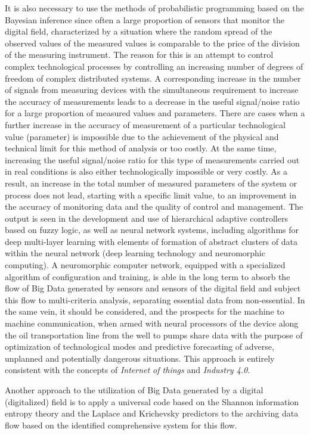 \documentclass[12pt]{report}
\theoremstyle{definition}
\begin{document}
It is also necessary to use the methods of probabilistic programming based on the Bayesian inference since often a large proportion of sensors that monitor the digital field, characterized by a situation where the random spread of the observed values of the measured values is comparable to the price of the division of the measuring instrument.
The reason for this is an attempt to control complex technological processes by controlling an increasing number of degrees of freedom of complex distributed systems.
A corresponding increase in the number of signals from measuring devices with the simultaneous requirement to increase the accuracy of measurements leads to a decrease in the useful signal/noise ratio for a large proportion of measured values and parameters.
There are cases when a further increase in the accuracy of measurement of a particular technological value (parameter) is impossible due to the achievement of the physical and technical limit for this method of analysis or too costly.
At the same time, increasing the useful signal/noise ratio for this type of measurements carried out in real conditions is also either technologically impossible or very costly.
As a result, an increase in the total number of measured parameters of the system or process does not lead, starting with a specific limit value, to an improvement in the accuracy of monitoring data and the quality of control and management.
The output is seen in the development and use of hierarchical adaptive controllers based on fuzzy logic, as well as neural network systems, including algorithms for deep multi-layer learning with elements of formation of abstract clusters of data within the neural network (deep learning technology and neuromorphic computing).
A neuromorphic computer network, equipped with a specialized algorithm of configuration and training, is able in the long term to absorb the flow of Big Data generated by sensors and sensors of the digital field and subject this flow to multi-criteria analysis, separating essential data from non-essential.
In the same vein, it should be considered, and the prospects for the machine to machine communication, when armed with neural processors of the device along the oil transportation line from the well to pumps share data with the purpose of optimization of technological modes and predictive forecasting of adverse, unplanned and potentially dangerous situations.
This approach is entirely consistent with the concepts of \textit{Internet of things} and \textit{Industry 4.0}.

Another approach to the utilization of Big Data generated by a digital (digitalized) field is to apply a universal code based on the Shannon information entropy theory and the Laplace and Krichevsky predictors to the archiving data flow based on the identified comprehensive system for this flow.
\end{document}
